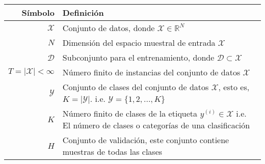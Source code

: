 \begin{table}[H]
    \begin{center}
        \begin{tabularx}{\textwidth}{|r|X|}
            \hline
            \textbf{Símbolo}                           & \textbf{Definición}                                                                                                                                                             \\
            \hline %
            $ \mathcal{X} $                            & Conjunto de datos, donde $\mathcal{X} \in \mathbb{R}^{N}$                                                                                                                       \\
            $ N $                                      & Dimensión del espacio muestral de entrada $\mathcal{X}$                                                                                                                         \\
            $ \mathcal{D} $                            & Subconjunto para el entrenamiento, donde $\mathcal{D} \subset \mathcal{X}$                                                                                                      \\
            $ T = \lvert \mathcal{X} \rvert < \infty $ & Número finito de instancias del conjunto de datos $\mathcal{X}$                                                                                                                 \\
            $ \mathcal{Y} $                            & Conjunto de clases del conjunto de datos $\mathcal{X}$, esto es, $\textit{K} = \lvert \mathcal{Y} \rvert$. \newline i.e. \scriptsize{${ \mathcal{Y} = \{1,2,...,\textit{K}\}}$} \\
            $ K $                                      & Número finito de clases de la etiqueta $y^{(i)} \in \mathcal{X}$ \newline i.e. \scriptsize{El número de clases o categorías de una clasificación}                               \\
            $ H $                                      & Conjunto de validación, este conjunto contiene muestras de todas las clases                                                                                                     \\

\end{tabularx}
\end{center}
\end{table}

